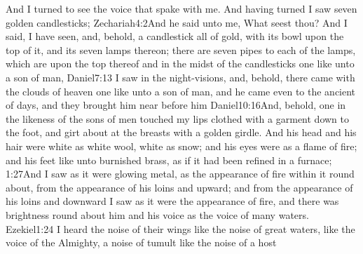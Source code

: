  And I turned to see the voice that spake with me. And having turned I saw seven golden candlesticks;%
	{Zechariah}{4:2}{And he said unto me, What seest thou? And I said, I have seen, and, behold, a candlestick all of gold, with its bowl upon the top of it, and its seven lamps thereon; there are seven pipes to each of the lamps, which are upon the top thereof}
 and in the midst of the candlesticks one like unto a son of man,%
%
			{Daniel}{7:13}{ I saw in the night-visions, and, behold, there came with the clouds of heaven one like unto a son of man, and he came even to the ancient of days, and they brought him near before him}%
			{Daniel}{10:16}{And, behold, one in the likeness of the sons of men touched my lips}%
clothed with a garment down to the foot, and girt about at the breasts with a golden girdle.%
 And his head and his hair were white as white wool, white as snow;%
and his eyes were as a flame of fire; %
 and his feet like unto burnished brass, as if it had been refined in a furnace;%
			{1:27}{And I saw as it were glowing metal, as the appearance of fire within it round about, from the appearance of his loins and upward; and from the appearance of his loins and downward I saw as it were the appearance of fire, and there was brightness round about him}%
and his voice as the voice of many waters.%
        		{Ezekiel}{1:24}{ I heard the noise of their wings like the noise of great waters, like the voice of the Almighty, a noise of tumult like the noise of a host}
